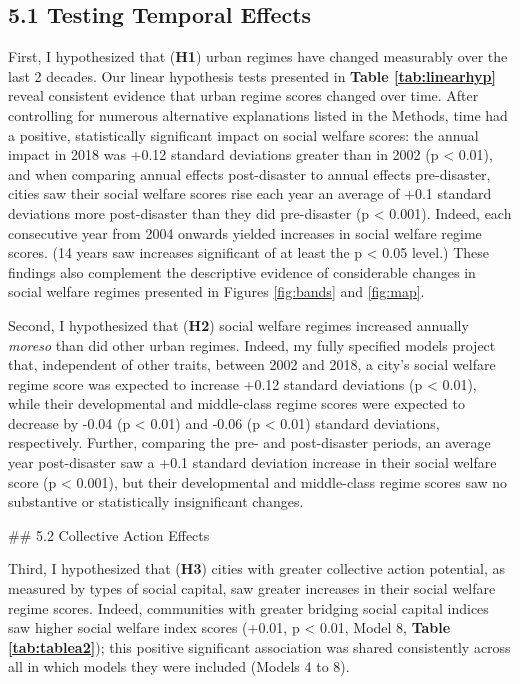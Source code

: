 \documentclass[preprint, 3p,
authoryear]{elsarticle} %
\begin{document}
\newpage
\renewcommand{\arraystretch}{1}
\doublespacing

\hypertarget{testing-temporal-effects}{%
\subsection{5.1 Testing Temporal
Effects}\label{testing-temporal-effects}}

First, I hypothesized that (\textbf{H1}) urban regimes have changed
measurably over the last 2 decades. Our linear hypothesis tests
presented in \textbf{Table \ref{tab:linearhyp}} reveal consistent
evidence that urban regime scores changed over time. After controlling
for numerous alternative explanations listed in the Methods, time had a
positive, statistically significant impact on social welfare scores: the
annual impact in 2018 was +0.12 standard deviations greater than in 2002
(p \textless{} 0.01), and when comparing annual effects post-disaster to
annual effects pre-disaster, cities saw their social welfare scores rise
each year an average of +0.1 standard deviations more post-disaster than
they did pre-disaster (p \textless{} 0.001). Indeed, each consecutive
year from 2004 onwards yielded increases in social welfare regime
scores. (14 years saw increases significant of at least the p
\textless{} 0.05 level.) These findings also complement the descriptive
evidence of considerable changes in social welfare regimes presented in
Figures \ref{fig:bands} and \ref{fig:map}.

Second, I hypothesized that (\textbf{H2}) social welfare regimes
increased annually \emph{moreso} than did other urban regimes. Indeed,
my fully specified models project that, independent of other traits,
between 2002 and 2018, a city's social welfare regime score was expected
to increase +0.12 standard deviations (p \textless{} 0.01), while their
developmental and middle-class regime scores were expected to decrease
by -0.04 (p \textless{} 0.01) and -0.06 (p \textless{} 0.01) standard
deviations, respectively. Further, comparing the pre- and post-disaster
periods, an average year post-disaster saw a +0.1 standard deviation
increase in their social welfare score (p \textless{} 0.001), but their
developmental and middle-class regime scores saw no substantive or
statistically insignificant changes.

\#\# 5.2 Collective Action Effects

Third, I hypothesized that (\textbf{H3}) cities with greater collective
action potential, as measured by types of social capital, saw greater
increases in their social welfare regime scores. Indeed, communities
with greater bridging social capital indices saw higher social welfare
index scores (+0.01, p \textless{} 0.01, Model 8,
\textbf{Table \ref{tab:tablea2}}); this positive significant association
was shared consistently across all in which models they were included
(Models 4 to 8).
\end{document}
